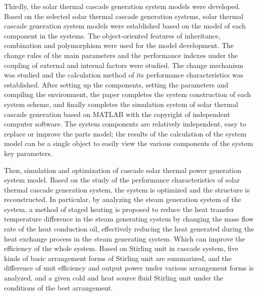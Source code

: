 {    Thirdly, the solar thermal cascade generation system models were developed. Based on the selected solar thermal cascade generation systems, solar thermal cascade generation system models were established based on the model of each component in the systems. The object-oriented features of inheritance, combination and polymorphism were used for the model development. The change rules of the main parameters and the performance indexes under the coupling of external and internal factors were studied. The change mechanism was studied and the calculation method of its performance characteristics was established. After setting up the components, setting the parameters and compiling the environment, the paper completes the system construction of each system scheme, and finally completes the simulation system of solar thermal cascade generation based on MATLAB with the copyright of independent computer software. The system components are relatively independent, easy to replace or improve the parts model; the results of the calculation of the system model can be a single object to easily view the various components of the system key parameters.

    Then, simulation and optimization of cascade solar thermal power generation system model. Based on the study of the performance characteristics of solar thermal cascade generation system, the system is optimized and the structure is reconstructed. In particular, by analyzing the steam generation system of the system, a method of staged heating is proposed to reduce the heat transfer temperature difference in the steam generating system by changing the mass flow rate of the heat conduction oil, effectively reducing the heat generated during the heat exchange process in the steam generating system. Which can improve the efficiency of the whole system. Based on Stirling unit in cascade system, five kinds of basic arrangement forms of Stirling unit are summarized, and the difference of unit efficiency and output power under various arrangement forms is analyzed, and a given cold and heat source fluid Stirling unit under the conditions of the best arrangement.

}
